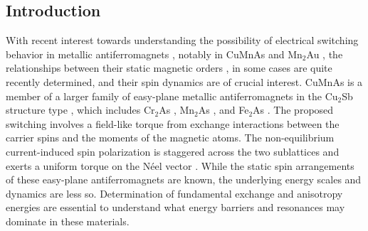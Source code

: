 \documentclass[10pt,doublespacing,edeposit]{uiucthesis2020}
\begin{document}
\begin{mainmatter}
\section{Introduction} 

With recent interest towards understanding the possibility of electrical switching behavior in metallic antiferromagnets \cite{Baltz2018,Siddiqui2020,Jungfleisch2018,Zelezny2018}, notably in CuMnAs \cite{Wadley2016,Grzybowski2017,Wadley2018,Matalla-Wagner2019} and Mn$_2$Au \cite{Meinert2018,Bodnar2019}, the relationships between their static magnetic orders \cite{Wadley2013,Hills2015,Wadley2015,Saidl2017}, in some cases are quite recently determined, and their spin dynamics \cite{Grzybowski2017,Bodnar2019,Yang2019,Yang2020} are of crucial interest. CuMnAs is a member of a larger family of easy-plane metallic antiferromagnets in the Cu$_2$Sb structure type \cite{Nateprov2011,Wadley2013}, which includes Cr$_2$As \cite{Yuzuri1960Cr2As}, Mn$_2$As \cite{Yuzuri1960}, and Fe$_2$As \cite{Katsuraki1966}.
The proposed switching involves a field-like torque from exchange interactions between the carrier spins and the moments of the magnetic atoms. The non-equilibrium current-induced spin polarization is staggered across the two sublattices and exerts a uniform torque on the N\'{e}el vector \cite{Zelezny2014,Zelezny2017,Wadley2016}.
While the static spin arrangements of these easy-plane antiferromagnets are known, the underlying energy scales and dynamics are less so. 
Determination of fundamental exchange and anisotropy energies are essential to understand what energy barriers and resonances may dominate in these materials.



\end{mainmatter}
\end{document}
